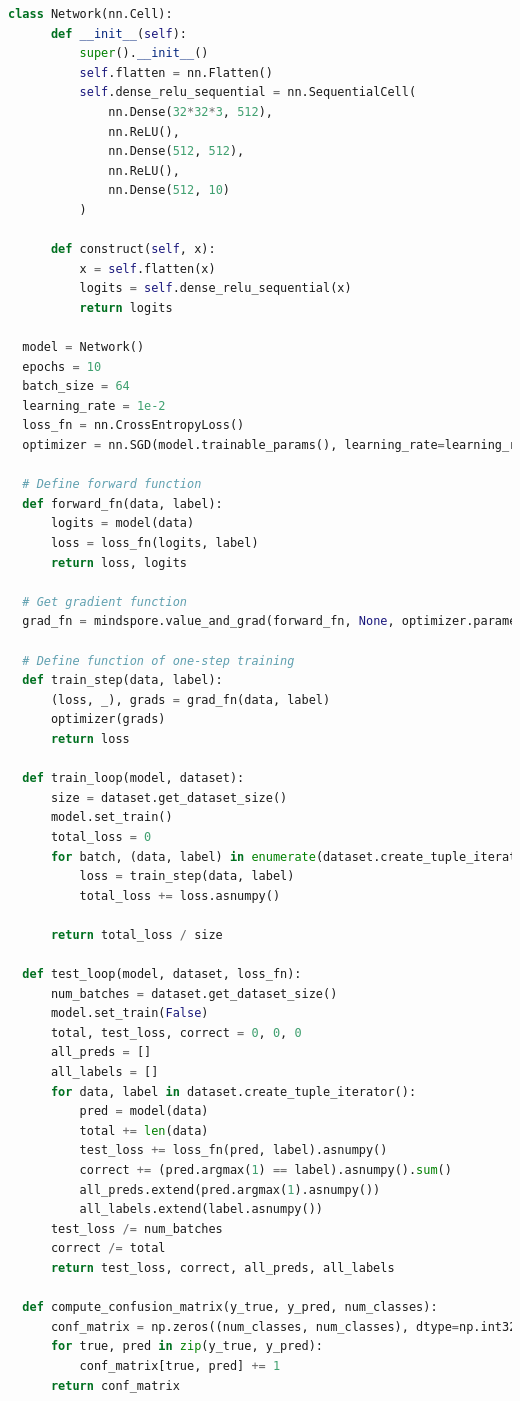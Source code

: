 \documentclass[12pt]{article}
\begin{document}
\begin{lstlisting}[language=Python]
  class Network(nn.Cell):
      def __init__(self):
          super().__init__()
          self.flatten = nn.Flatten()
          self.dense_relu_sequential = nn.SequentialCell(
              nn.Dense(32*32*3, 512),
              nn.ReLU(),
              nn.Dense(512, 512),
              nn.ReLU(),
              nn.Dense(512, 10)
          )
  
      def construct(self, x):
          x = self.flatten(x)
          logits = self.dense_relu_sequential(x)
          return logits
  
  model = Network()
  epochs = 10
  batch_size = 64
  learning_rate = 1e-2
  loss_fn = nn.CrossEntropyLoss()
  optimizer = nn.SGD(model.trainable_params(), learning_rate=learning_rate)
  
  # Define forward function
  def forward_fn(data, label):
      logits = model(data)
      loss = loss_fn(logits, label)
      return loss, logits
  
  # Get gradient function
  grad_fn = mindspore.value_and_grad(forward_fn, None, optimizer.parameters, has_aux=True)
  
  # Define function of one-step training
  def train_step(data, label):
      (loss, _), grads = grad_fn(data, label)
      optimizer(grads)
      return loss
  
  def train_loop(model, dataset):
      size = dataset.get_dataset_size()
      model.set_train()
      total_loss = 0
      for batch, (data, label) in enumerate(dataset.create_tuple_iterator()):
          loss = train_step(data, label)
          total_loss += loss.asnumpy()
      
      return total_loss / size
  
  def test_loop(model, dataset, loss_fn):
      num_batches = dataset.get_dataset_size()
      model.set_train(False)
      total, test_loss, correct = 0, 0, 0
      all_preds = []
      all_labels = []
      for data, label in dataset.create_tuple_iterator():
          pred = model(data)
          total += len(data)
          test_loss += loss_fn(pred, label).asnumpy()
          correct += (pred.argmax(1) == label).asnumpy().sum()
          all_preds.extend(pred.argmax(1).asnumpy())
          all_labels.extend(label.asnumpy())
      test_loss /= num_batches
      correct /= total
      return test_loss, correct, all_preds, all_labels
  
  def compute_confusion_matrix(y_true, y_pred, num_classes):
      conf_matrix = np.zeros((num_classes, num_classes), dtype=np.int32)
      for true, pred in zip(y_true, y_pred):
          conf_matrix[true, pred] += 1
      return conf_matrix
  

\end{lstlisting}
\end{document}
